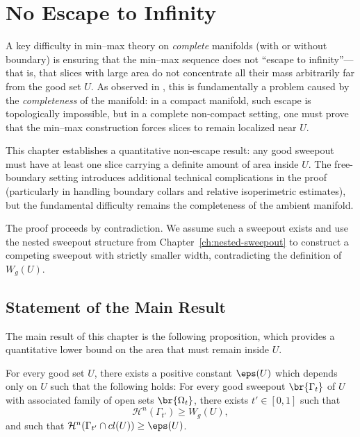 \chapter{No Escape to Infinity}\label{ch:no-escape-to-infinity}

A key difficulty in min--max theory on \emph{complete} manifolds (with or without boundary) is ensuring that the min--max sequence does not ``escape to infinity''---that is, that slices with large area do not concentrate all their mass arbitrarily far from the good set $U$. As observed in \cite{CL20}, this is fundamentally a problem caused by the \emph{completeness} of the manifold: in a compact manifold, such escape is topologically impossible, but in a complete non-compact setting, one must prove that the min--max construction forces slices to remain localized near $U$.

This chapter establishes a quantitative non-escape result: any good sweepout must have at least one slice carrying a definite amount of area inside $U$. The free-boundary setting introduces additional technical complications in the proof (particularly in handling boundary collars and relative isoperimetric estimates), but the fundamental difficulty remains the completeness of the ambient manifold.

The proof proceeds by contradiction. We assume such a sweepout exists and use the nested sweepout structure from Chapter~\ref{ch:nested-sweepout} to construct a competing sweepout with strictly smaller width, contradicting the definition of $W_g(U)$.

\section{Statement of the Main Result}\label{sec:non-escape-statement}

The main result of this chapter is the following proposition, which provides a quantitative lower
bound on the area that must remain inside $U$.

\begin{proposition}\label{prop:non-escape}
    For every good set $U$, there exists a positive constant $\eps(U)$ which depends only on $U$ such that the following holds: For every good sweepout $\br{\Gamma_t}$ of $U$ with associated family of open sets $\br{\Omega_t}$, there exists $t' \in [0, 1]$ such that
    \begin{equation*}
        \mathcal{H}^n(\Gamma_{t'}) \geq W_g(U),
    \end{equation*}
    and such that $\mathcal{H}^n(\Gamma_{t'}\cap cl(U)) \geq \eps(U)$.
\end{proposition}

